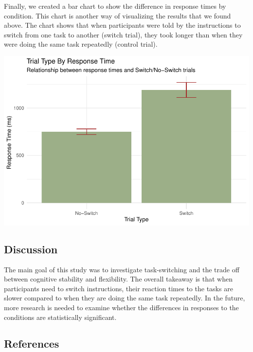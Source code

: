 \documentclass[
  11pt,
]{article}
\begin{document}
Finally, we created a bar chart to show the difference in response times
by condition. This chart is another way of visualizing the results that
we found above. The chart shows that when participants were told by the
instructions to switch from one task to another (switch trial), they
took longer than when they were doing the same task repeatedly (control
trial).

\includegraphics{final_paper_EDLD_files/figure-latex/unnamed-chunk-6-1.pdf}

\subsection{Discussion}\label{discussion}

The main goal of this study was to investigate task-switching and the
trade off between cognitive stability and flexibility. The overall
takeaway is that when participants need to switch instructions, their
reaction times to the tasks are slower compared to when they are doing
the same task repeatedly. In the future, more research is needed to
examine whether the differences in responses to the conditions are
statistically significant.

\newpage

\subsection*{References}\label{references}
\end{document}
